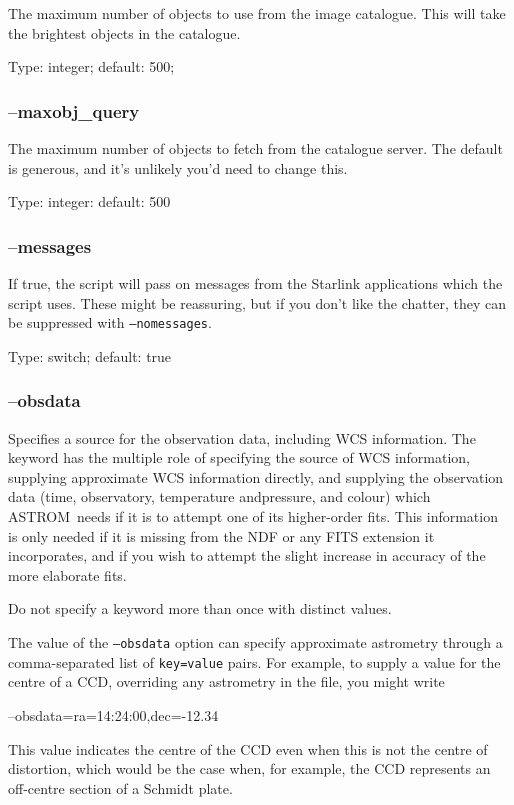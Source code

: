 \documentclass[twoside,11pt,nolof]{starlink}
\providecommand{\ASTROM}{{\footnotesize ASTROM}\normalsize}
\begin{document}
The maximum number of objects to use from the image catalogue. This will take
the brightest objects in the catalogue.

Type: integer; default: 500;

\subsubsection{--maxobj\_query\label{sb:options:maxobj_query}}

The maximum number of objects to fetch from the catalogue server. The default
is generous, and it's unlikely you'd need to change this.

Type: integer: default: 500

\subsubsection{--messages\label{sb:options:messages}}

If true, the script will pass on messages from the Starlink applications which
the script uses.  These might be reassuring, but if you don't like the
chatter, they can be suppressed with \texttt{--nomessages}.

Type: switch; default: true

\subsubsection{--obsdata\label{sb:options:obsdata}}

Specifies a source for the observation data, including WCS information.  The
keyword has the multiple role of specifying the source of WCS information,
supplying approximate WCS information directly, and supplying the observation
data (time, observatory, temperature andpressure, and colour) which \ASTROM\
needs if it is to attempt one of its higher-order fits.  This information is
only needed if it is missing from the NDF or any FITS extension it
incorporates, and if you wish to attempt the slight increase in accuracy of
the more elaborate fits.

Do not specify a keyword more than once with distinct values.

The value of the \texttt{--obsdata} option can specify approximate astrometry
through a comma-separated list of \texttt{key=value} pairs.  For example, to
supply a value for the centre of a CCD, overriding any astrometry in the file,
you might write
\begin{terminalv}
 --obsdata=ra=14:24:00,dec=-12.34
\end{terminalv}
This value indicates the centre of the CCD even when this is not the centre of
distortion, which would be the case when, for example, the CCD represents an
off-centre section of a Schmidt plate.
\end{document}
